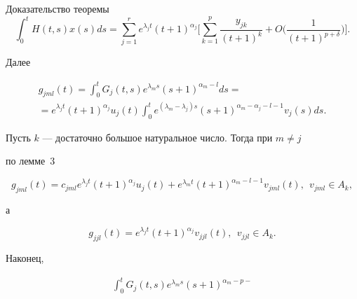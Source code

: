 \begin{pf*}{Доказательство теоремы}
\begin{equation}
\int_0^t H (t,s)x(s)ds=\sum\limits_{j=1}^{r}


e^{\lambda_jt}(t+1)^{\alpha_{j}} \bigg[


\sum\limits_{k=1}^{p}\frac{y_{jk}}{(t+1)^{k}}+


O \bigg(\frac1{(t+1)^{p+\delta}} \bigg) \bigg].


\end{equation}


Далее


\begin{gather*}


g_{jml} (t)=\int_0^t G_j (t,s)


e^{\lambda_m s}(s+1)^{\alpha_{m}-l}ds=\\


%


=e^{\lambda_jt}(t+1)^{\alpha_{j}}


u_j (t) \int_0^t e^{ (\lambda_m-\lambda_j)s}


(s+1)^{\alpha_{m}-\alpha_{j}-l-1}v_j (s)ds.


\end{gather*}





Пусть $k$ --- достаточно большое натуральное число. Тогда при $m\neq j$


по лемме~3


\begin{equation}


\label{12}


g_{jml} (t)=c_{jml} e^{\lambda_jt}(t+1)^{\alpha_{j}}


u_j (t)+e^{\lambda_m t}(t+1)^{\alpha_{m}-l-1}


v_{jml} (t),\ \ v_{jml} \in A_{k},


\end{equation}


а


\begin{equation}


\label{13}


g_{jjl} (t)=e^{\lambda_j t}(t+1)^{\alpha_{j}}


v_{jjl} (t),\ \ v_{jjl} \in A_{k}.


\end{equation}


Наконец,


\begin{multline}


\label{14}


\int_0^t G_j(t,s) e^{\lambda_m s} (s+1)^{\alpha_{m}-p-


}
\end{multline}
\end{pf*}
